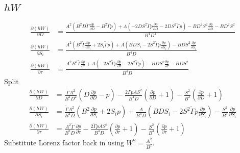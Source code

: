 \documentclass{article}
\begin{document}
\subsection{$hW$}
\begin{align*}
  \frac{\partial (hW)}{\partial D} &= \frac{A^{2} \left(B^{2} D \widetilde{\Gamma} \frac{\partial p}{\partial D} - B^{2} \widetilde{\Gamma} p\right) + A \left(- 2 D S^{2} \widetilde{\Gamma} p \frac{\partial p}{\partial D} - 2 D S^{2} \widetilde{\Gamma} p\right) - B D^{2} S^{2} \frac{\partial p}{\partial D} - B D^{2} S^{2}}{B^{4} D^{2}}\\
  \frac{\partial (hW)}{\partial S_i} &= \frac{A^{2} \left(B^{2} \widetilde{\Gamma} \frac{\partial p}{\partial S_i} + 2 S_i \widetilde{\Gamma} p\right) + A \left(B D S_i - 2 S^{2} \widetilde{\Gamma} p \frac{\partial p}{\partial S_i}\right) - B D S^{2} \frac{\partial p}{\partial S_i}}{B^{4} D}\\
  \frac{\partial (hW)}{\partial \tau} &= \frac{A^{2} B^{2} \widetilde{\Gamma} \frac{\partial p}{\partial \tau} + A \left(- 2 S^{2} \widetilde{\Gamma} p \frac{\partial p}{\partial \tau} - 2 S^{2} \widetilde{\Gamma} p\right) - B D S^{2} \frac{\partial p}{\partial \tau} - B D S^{2}}{B^{4} D}
\end{align*}
Split
\begin{align*}
  \frac{\partial (hW)}{\partial D} &= \frac{\widetilde{\Gamma} A^{2}}{B^2 D^{2}} \left(D \frac{\partial p}{\partial D} - p\right) - \frac{2 \widetilde{\Gamma} p A S^2}{B^{4} D} \left(\frac{\partial p}{\partial D} + 1\right) - \frac{S^{2}}{B^3}\left(\frac{\partial p}{\partial D} + 1\right)\\
  \frac{\partial (hW)}{\partial S_i} &= \frac{\widetilde{\Gamma} A^{2}}{B^{4} D} \left(B^{2}  \frac{\partial p}{\partial S_i} + 2 S_i p\right) + \frac{A}{B^{4} D} \left(B D S_i - 2 S^{2} \widetilde{\Gamma} p \frac{\partial p}{\partial S_i}\right) - \frac{S^{2}}{B^3} \frac{\partial p}{\partial S_i}\\
  \frac{\partial (hW)}{\partial \tau} &= \frac{A^{2} \widetilde{\Gamma}}{B^2 D} \frac{\partial p}{\partial \tau} - \frac{2 \widetilde{\Gamma} p A S^2}{B^{4} D} \left(\frac{\partial p}{\partial \tau} + 1\right) - \frac{S^{2}}{B^3} \left(\frac{\partial p}{\partial \tau} + 1\right)
\end{align*}
Substitute Lorenz factor back in using $W^2 = \frac{A^2}{B^2}$.
\end{document}
